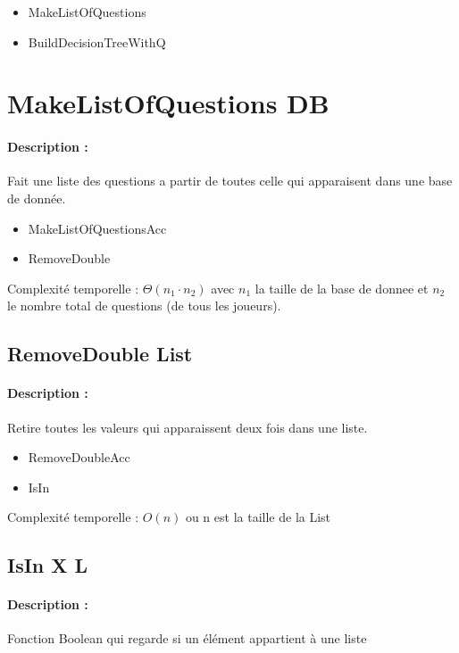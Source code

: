 \documentclass[10pt,a4paper]{article}
\begin{document}
\begin{itemize}
\item MakeListOfQuestions
\item BuildDecisionTreeWithQ
\end{itemize}

\section{MakeListOfQuestions DB}
\paragraph{Description :} Fait une liste des questions a partir de toutes celle qui apparaisent dans une base de donnée.

\begin{itemize}
\item MakeListOfQuestionsAcc
\item RemoveDouble
\end{itemize}

Complexité temporelle : $\Theta(n_1 \cdot n_2)$ avec $n_1$ la taille de la base de donnee et $n_2$ le nombre total de questions (de tous les joueurs).

\subsection{RemoveDouble List}
\paragraph{Description :} Retire toutes les valeurs qui apparaissent deux fois dans une liste.

\begin{itemize}
\item RemoveDoubleAcc
\item IsIn
\end{itemize}

Complexité temporelle : $O(n)$ ou n est la taille de la List

\subsection{IsIn X L}
\paragraph{Description :} Fonction Boolean qui regarde si un élément appartient à une liste
\end{document}
